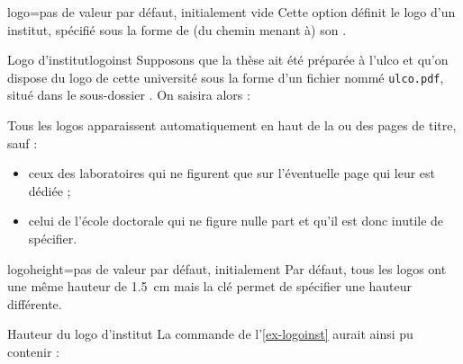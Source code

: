 \begin{docKey}{logo}{=}{pas de valeur
    par défaut, initialement vide}
  Cette option définit le logo d'un institut, spécifié sous la forme de (du
  chemin menant à) son .
  \begin{dbexample}{Logo d'institut}{logoinst}
    Supposons que la thèse ait été préparée à l'\gls{ulco} et qu'on dispose du
    logo de cette université sous la forme d'un fichier nommé
    \texttt{ulco.pdf}, situé dans le sous-dossier . On
    saisira alors :
\begin{preamblecode}[listing options={deletekeywords={[5]institute}}]
\end{preamblecode}
\end{dbexample}
Tous les logos apparaissent automatiquement en haut de la ou des
pages de titre, sauf :
\begin{itemize}
\item ceux des laboratoires qui ne figurent que sur l'éventuelle page qui leur
  est dédiée ;
\item celui de l'école doctorale qui ne figure nulle part et qu'il est donc
  inutile de spécifier.
\end{itemize}
\end{docKey}
%
\begin{docKey}{logoheight}{=}{pas de valeur par
    défaut, initialement \docValue*{1.5cm}}
  Par défaut, tous les logos ont une même hauteur de \SI{1.5}{\cm}
  mais la clé  permet de spécifier une hauteur
  différente.
  \begin{dbexample}{Hauteur du logo d'institut}{}
    La commande de l'\vref{ex-logoinst} aurait ainsi pu contenir :
\begin{preamblecode}[listing options={deletekeywords={[5]institute}}]
\end{preamblecode}
\end{dbexample}
\end{docKey}
%
%

